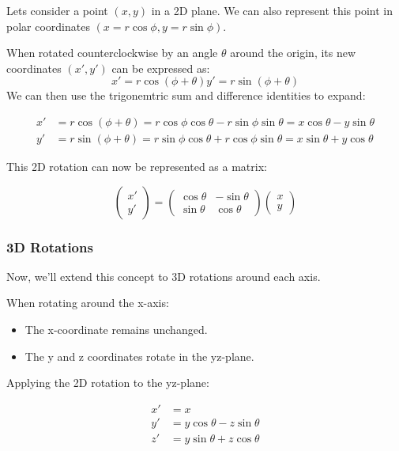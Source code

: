 \documentclass[12pt]{article}
\begin{document}
Lets consider a point $(x, y)$ in a 2D plane. We can also represent this point in polar coordinates $(x = r \cos\phi, y = r \sin\phi)$.

When rotated counterclockwise by an angle $\theta$ around the origin, its new coordinates $(x', y')$ can be expressed as:
$$
    x' = r \cos(\phi + \theta)
    y' = r \sin(\phi + \theta)
$$
We can then use the trigonemtric sum and difference identities to expand:

$$
    \begin{aligned}
        x' & = r \cos(\phi + \theta) = r \cos\phi \cos\theta - r \sin\phi \sin\theta = x \cos\theta - y \sin\theta \\
        y' & = r \sin(\phi + \theta) = r \sin\phi \cos\theta + r \cos\phi \sin\theta = x \sin\theta + y \cos\theta
    \end{aligned}
$$

This 2D rotation can now be represented as a matrix:

$$
    \begin{pmatrix}
        x' \\ y'
    \end{pmatrix} =
    \begin{pmatrix}
        \cos\theta & -\sin\theta \\
        \sin\theta & \cos\theta
    \end{pmatrix}
    \begin{pmatrix}
        x \\ y
    \end{pmatrix}
$$

\subsubsection{3D Rotations}

Now, we'll extend this concept to 3D rotations around each axis.

When rotating around the x-axis:
\begin{itemize}
    \item The x-coordinate remains unchanged.
    \item The y and z coordinates rotate in the yz-plane.
\end{itemize}

Applying the 2D rotation to the yz-plane:

$$
    \begin{aligned}
        x' & = x                           \\
        y' & = y \cos\theta - z \sin\theta \\
        z' & = y \sin\theta + z \cos\theta
    \end{aligned}
$$
\end{document}
